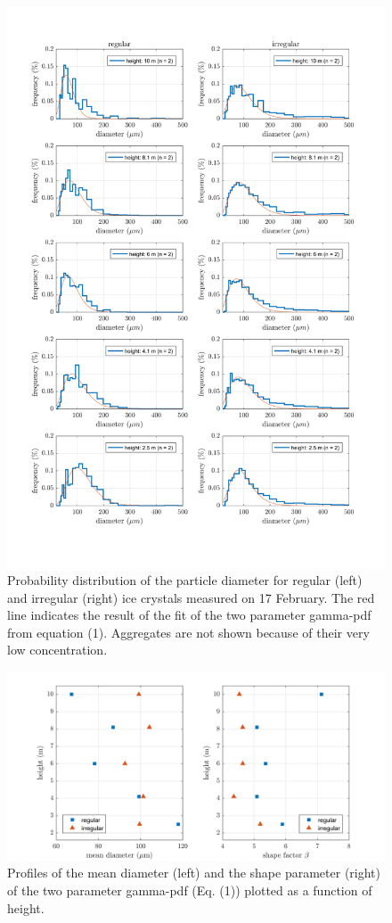 \documentclass[draft,linenumbers]{agujournal}
\begin{document}
\begin{figure}[t]
 \centering
 	\includegraphics[width=14cm]{gammaPDF.png}
 \caption{Probability distribution of the particle diameter for regular (left) and irregular (right) ice crystals measured on 17 February. The red line indicates the result of the fit of the two parameter gamma-pdf from equation (1). Aggregates are not shown because of their very low concentration.}
 \label{fig:gammaPDF}
\end{figure}

\begin{figure}[t]
 \centering
 	\includegraphics[width=14cm]{MeanShape.png}
 \caption{Profiles of the mean diameter (left) and the shape parameter (right) of the two parameter gamma-pdf (Eq. (1)) plotted as a function of height.}
 \label{fig:shapeFactor}
\end{figure}
\end{document}
